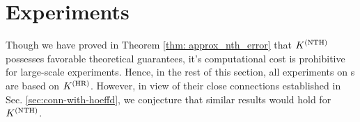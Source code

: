 \section{Experiments}\label{sec:experiment}












Though we have proved in Theorem \mbox{\ref{thm: approx_nth_error}} that $K^{(\textnormal{NTH})}$ possesses favorable theoretical guarantees, it's computational cost is prohibitive for large-scale experiments. Hence, in the rest of this section, all experiments on \lantk s are based on $K^{(\textnormal{HR})}$. However, in view of their close connections established in Sec. \ref{sec:conn-with-hoeffd}, we conjecture that similar results would hold for $K^{(\textnormal{NTH})}$.

